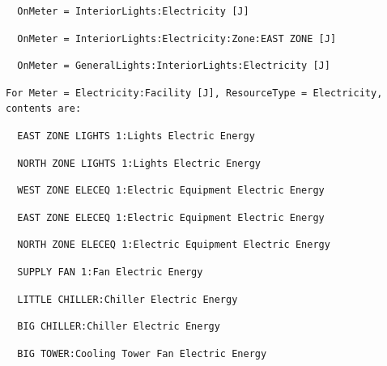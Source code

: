 \begin{lstlisting}
  OnMeter = InteriorLights:Electricity [J]
\end{lstlisting}

\begin{lstlisting}
  OnMeter = InteriorLights:Electricity:Zone:EAST ZONE [J]
\end{lstlisting}

\begin{lstlisting}
  OnMeter = GeneralLights:InteriorLights:Electricity [J]
\end{lstlisting}

\begin{lstlisting}
For Meter = Electricity:Facility [J], ResourceType = Electricity, contents are:
\end{lstlisting}

\begin{lstlisting}
  EAST ZONE LIGHTS 1:Lights Electric Energy
\end{lstlisting}

\begin{lstlisting}
  NORTH ZONE LIGHTS 1:Lights Electric Energy
\end{lstlisting}

\begin{lstlisting}
  WEST ZONE ELECEQ 1:Electric Equipment Electric Energy
\end{lstlisting}

\begin{lstlisting}
  EAST ZONE ELECEQ 1:Electric Equipment Electric Energy
\end{lstlisting}

\begin{lstlisting}
  NORTH ZONE ELECEQ 1:Electric Equipment Electric Energy
\end{lstlisting}

\begin{lstlisting}
  SUPPLY FAN 1:Fan Electric Energy
\end{lstlisting}

\begin{lstlisting}
  LITTLE CHILLER:Chiller Electric Energy
\end{lstlisting}

\begin{lstlisting}
  BIG CHILLER:Chiller Electric Energy
\end{lstlisting}

\begin{lstlisting}
  BIG TOWER:Cooling Tower Fan Electric Energy
\end{lstlisting}

